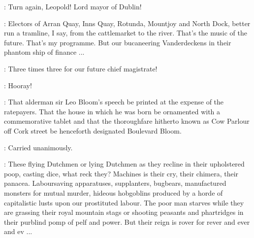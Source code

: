 
\Chimes:
Turn again, Leopold!
Lord mayor of Dublin!

\Bloom:
Electors of Arran Quay, Inns Quay, Rotunda, Mountjoy and North Dock,
better run a tramline, I say, from the cattlemarket to the river.
That's the music of the future.
That's my programme.
But our bucaneering Vanderdeckens in their phantom ship of finance ...%

\Elector:
Three times three for our future chief magistrate!


\Torchbearers:
Hooray!


\Harrington:
That alderman sir Leo Bloom's speech be printed at the expense of the ratepayers.
That the house in which he was born be ornamented with a commemorative tablet
and that the thoroughfare hitherto known as Cow Parlour off Cork street
be henceforth designated Boulevard Bloom.

\Lorcan:
Carried unanimously.

\Bloom:
These flying Dutchmen or lying Dutchmen as they recline
in their upholstered poop, casting dice, what reck they?
Machines is their cry, their chimera, their panacea.
Laboursaving apparatuses, supplanters, bugbears,
manufactured monsters for mutual murder,
hideous hobgoblins produced by a horde of capitalistic lusts upon our prostituted labour.
The poor man starves while they are grassing their royal mountain stags
or shooting peasants and phartridges in their purblind pomp of pelf and power.
But their reign is rover for rever and ever and ev ...

